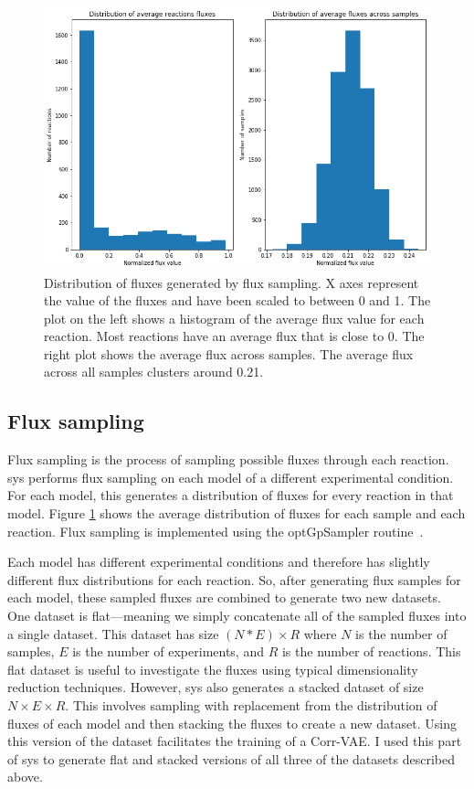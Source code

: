 \begin{figure}[t!]
\begin{center}
\includegraphics[width=\textwidth]{figs/fluxdistribution.png}
\caption[Distribution of fluxes generated by flux sampling]{Distribution of fluxes generated by flux sampling.
X axes represent the value of the fluxes and have been scaled to between 0 and 1.
The plot on the left shows a histogram of the average flux value for each reaction.
Most reactions have an average flux that is close to 0.
The right plot shows the average flux across samples.
The average flux across all samples clusters around 0.21. 
}
\label{fig:distrib}
\end{center}
\end{figure}

\subsection{Flux sampling}
Flux sampling is the process of sampling possible fluxes through each reaction.
\gls{sys} performs flux sampling on each model of a different experimental condition.
For each model, this generates a distribution of fluxes for every reaction in that model.
Figure \ref{fig:distrib} shows the average distribution of fluxes for each sample and each reaction.
Flux sampling is implemented using the optGpSampler routine~\cite{megchelenbrink2014optgpsampler}.

Each model has different experimental conditions and therefore has slightly different flux distributions for each reaction.
So, after generating flux samples for each model, these sampled fluxes are combined to generate two new datasets.
One dataset is flat---meaning we simply concatenate all of the sampled fluxes into a single dataset.
This dataset has size $(N * E) \times R$ where $N$ is the number of samples, $E$ is the number of experiments, and $R$ is the number of reactions.
This flat dataset is useful to investigate the fluxes using typical dimensionality reduction techniques.
However, \gls{sys} also generates a stacked dataset of size $N \times E \times R$. 
This involves sampling with replacement from the distribution of fluxes of each model and then stacking the fluxes to create a new dataset.
Using this version of the dataset facilitates the training of a Corr-VAE.
I used this part of \gls{sys} to generate flat and stacked versions of all three of the datasets described above.

